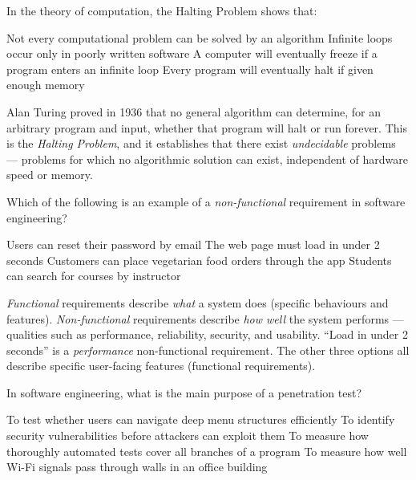 \documentclass[answers]{exam}
\begin{document}
\begin{questions}
\question In the theory of computation, the Halting Problem shows that:

\begin{choices}
    \correctchoice Not every computational problem can be solved by an algorithm
    \choice Infinite loops occur only in poorly written software
    \choice A computer will eventually freeze if a program enters an infinite loop
    \choice Every program will eventually halt if given enough memory
\end{choices}

\begin{solution}
    Alan Turing proved in 1936 that no general algorithm can determine, for an arbitrary program and input, whether that program will halt or run forever.
    This is the \textit{Halting Problem}, and it establishes that there exist \textit{undecidable} problems --- problems for which no algorithmic solution can exist, independent of hardware speed or memory.
\end{solution}

\question Which of the following is an example of a \textit{non-functional} requirement in software engineering?

\begin{choices}
    \choice Users can reset their password by email
    \correctchoice The web page must load in under 2 seconds
    \choice Customers can place vegetarian food orders through the app
    \choice Students can search for courses by instructor
\end{choices}

\begin{solution}
    \textit{Functional} requirements describe \textit{what} a system does (specific behaviours and features).
    \textit{Non-functional} requirements describe \textit{how well} the system performs --- qualities such as performance, reliability, security, and usability.
    ``Load in under 2 seconds'' is a \textit{performance} non-functional requirement.
    The other three options all describe specific user-facing features (functional requirements).
\end{solution}

\question In software engineering, what is the main purpose of a penetration test?

\begin{choices}
    \choice To test whether users can navigate deep menu structures efficiently
    \correctchoice To identify security vulnerabilities before attackers can exploit them
    \choice To measure how thoroughly automated tests cover all branches of a program
    \choice To measure how well Wi-Fi signals pass through walls in an office building
\end{choices}


\end{questions}
\end{document}
